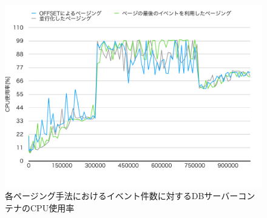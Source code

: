 \documentclass[../../../../../main]{subfiles}
\begin{document}
    \begin{figure}[H]
        \centering
        \includegraphics[width=12cm]{graph}
        \caption{各ページング手法におけるイベント件数に対するDBサーバーコンテナのCPU使用率}
        \label{fig:each-paging-db-cpu-app_1_1024-db_1_1024}
    \end{figure}
\end{document}
